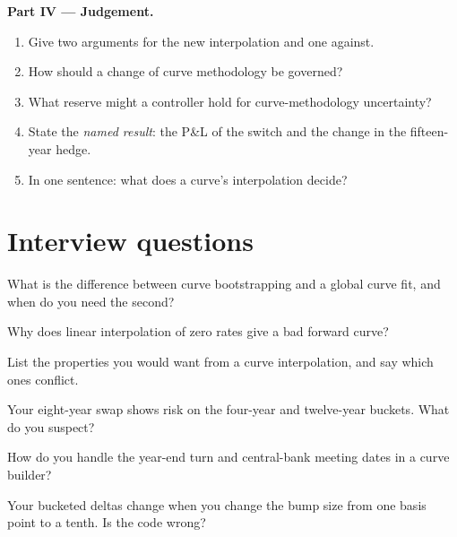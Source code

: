 \begin{problem}
\medskip\noindent\textbf{Part IV --- Judgement.}
\begin{enumerate}[resume]
\item Give two arguments for the new interpolation and one against.
\item How should a change of curve methodology be governed?
\item What reserve might a controller hold for curve-methodology uncertainty?
\item State the \emph{named result}: the P\&L of the switch and the change in the
fifteen-year hedge.
\item In one sentence: what does a curve's interpolation decide?
\end{enumerate}
\end{problem}

\section{Interview questions}

\begin{interviewq}\label{iq:rc:curve-construction:1}
What is the difference between curve bootstrapping and a global curve fit, and
when do you need the second?
\end{interviewq}

\begin{interviewq}\label{iq:rc:curve-construction:2}
Why does linear interpolation of zero rates give a bad forward curve?
\end{interviewq}

\begin{interviewq}\label{iq:rc:curve-construction:3}
List the properties you would want from a curve interpolation, and say which
ones conflict.
\end{interviewq}

\begin{interviewq}\label{iq:rc:curve-construction:4}
Your eight-year swap shows risk on the four-year and twelve-year buckets. What
do you suspect?
\end{interviewq}

\begin{interviewq}\label{iq:rc:curve-construction:5}
How do you handle the year-end turn and central-bank meeting dates in a curve
builder?
\end{interviewq}

\begin{interviewq}\label{iq:rc:curve-construction:6}
Your bucketed deltas change when you change the bump size from one basis point
to a tenth. Is the code wrong?
\end{interviewq}
